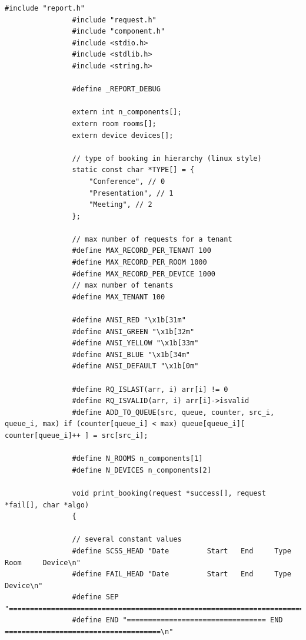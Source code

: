 \documentclass{article}
\begin{document}
            \begin{Verbatim}[gobble=8]
                #include "report.h"
                #include "request.h"
                #include "component.h"
                #include <stdio.h>
                #include <stdlib.h>
                #include <string.h>
                
                #define _REPORT_DEBUG
                
                extern int n_components[];
                extern room rooms[];
                extern device devices[];
                
                // type of booking in hierarchy (linux style)
                static const char *TYPE[] = {
                    "Conference", // 0
                    "Presentation", // 1
                    "Meeting", // 2
                };
                
                // max number of requests for a tenant
                #define MAX_RECORD_PER_TENANT 100
                #define MAX_RECORD_PER_ROOM 1000
                #define MAX_RECORD_PER_DEVICE 1000
                // max number of tenants
                #define MAX_TENANT 100
                
                #define ANSI_RED "\x1b[31m"
                #define ANSI_GREEN "\x1b[32m"
                #define ANSI_YELLOW "\x1b[33m"
                #define ANSI_BLUE "\x1b[34m"
                #define ANSI_DEFAULT "\x1b[0m"
                
                #define RQ_ISLAST(arr, i) arr[i] != 0
                #define RQ_ISVALID(arr, i) arr[i]->isvalid
                #define ADD_TO_QUEUE(src, queue, counter, src_i, queue_i, max) if (counter[queue_i] < max) queue[queue_i][ counter[queue_i]++ ] = src[src_i];
                
                #define N_ROOMS n_components[1]
                #define N_DEVICES n_components[2]
                
                void print_booking(request *success[], request *fail[], char *algo)
                {
                
                // several constant values
                #define SCSS_HEAD "Date         Start   End     Type          Room     Device\n"
                #define FAIL_HEAD "Date         Start   End     Type          Device\n"
                #define SEP "===========================================================================\n"
                #define END "================================= END =====================================\n"
                

\end{Verbatim}
\end{document}
